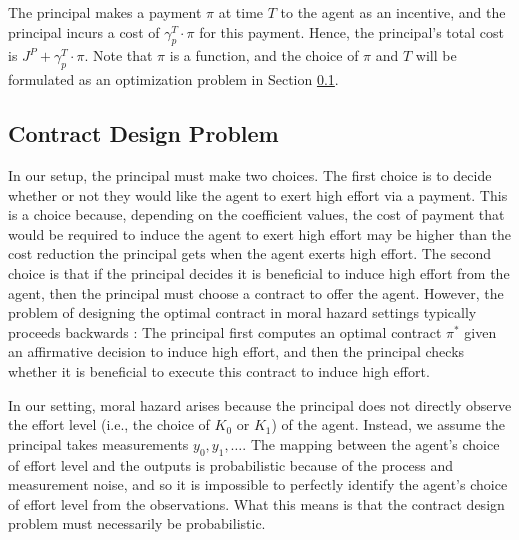 \documentclass[letterpaper, 10 pt, conference]{ieeeconf}  %
\begin{document}
The principal makes a payment $\pi$ at time $T$ to the agent as an incentive, and the principal incurs a cost of $\gamma_p^T \cdot \pi$ for this payment. Hence, the principal's total cost is $J^P + \gamma_p^T \cdot \pi$. Note that $\pi$ is a function, and the choice of $\pi$ and $T$ will be formulated as an optimization problem in Section \ref{subsec: contract design problem}.



\subsection{Contract Design Problem}
\label{subsec: contract design problem}
In our setup, the principal must make two choices. The first choice is to decide whether or not they would like the agent to exert high effort via a payment. This is a choice because, depending on the coefficient values, the cost of payment that would be required to induce the agent to exert high effort may be higher than the cost reduction the principal gets when the agent exerts high effort. The second choice is that if the principal decides it is beneficial to induce high effort from the agent, then the principal must choose a contract to offer the agent. However, the problem of designing the optimal contract in moral hazard settings typically proceeds backwards \cite{Laffont}: The principal first computes an optimal contract $\pi^*$ given an affirmative decision to induce high effort, and then the principal checks whether it is beneficial to execute this contract to induce high effort. 

In our setting, moral hazard arises because the principal does not directly observe the effort level (i.e., the choice of $K_0$ or $K_1$) of the agent. Instead, we assume the principal takes measurements $y_0, y_1, \ldots$. The mapping between the agent's choice of effort level and the outputs is probabilistic because of the process and measurement noise, and so it is impossible to perfectly identify the agent's choice of effort level from the observations. What this means is that the contract design problem must necessarily be probabilistic.
\end{document}
